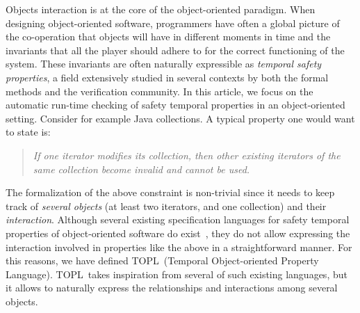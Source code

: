 \documentclass{llncs} %
\newcommand{\TPL}{TOPL}
\begin{document}
Objects interaction is at the core of the object-oriented paradigm. When designing object-oriented software, 
programmers have often  a global picture of the co-operation that objects will have in different moments in time and the 
invariants that all the player should adhere to for the correct functioning of the system.
These invariants are often naturally expressible as {\em temporal safety properties}, a field extensively 
studied in several contexts by both the formal methods and the verification community. 
%
In this article, we focus on the automatic run-time checking of safety temporal properties in an object-oriented setting. 
Consider for  example  Java collections. A typical property one would want to state is:
\begin{quote}
{\em If one iterator modifies its collection, then other existing iterators of the same collection become invalid and cannot be used.}
\end{quote}
\noindent
The formalization of the above constraint is non-trivial since it 
needs to keep track of {\em several objects} (at least two iterators, and one collection) and their {\em interaction}.
Although several existing specification languages for safety temporal properties of object-oriented software do exist~\cite{strom1986,dblp:conf/oopsla/bierhoffa07,dblp:conf/oopsla/naeeml08,disney2011,ball2002},
they do not allow expressing the interaction involved in properties like the above in a straightforward manner. 
For this reasons,  we have defined  \TPL\ (Temporal Object-oriented Property Language).
%
\TPL \ takes inspiration from several of such existing  languages, but it allows 
to naturally express  the relationships and interactions among several objects.
\end{document}
